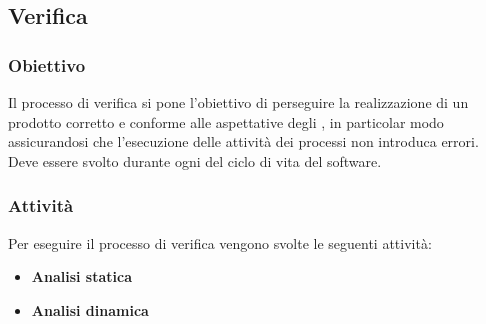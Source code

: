 \subsection{Verifica}
\subsubsection{Obiettivo}
Il processo di verifica si pone l’obiettivo di perseguire la realizzazione di un prodotto corretto e conforme alle aspettative degli , in particolar modo assicurandosi che l'esecuzione delle attività dei processi non introduca errori.
Deve essere svolto durante ogni  del ciclo di vita del software.

\subsubsection{Attività}
Per eseguire il processo di verifica vengono svolte le seguenti attività:
\begin{itemize} 
\item \textbf{Analisi statica}
\item \textbf{Analisi dinamica}
\end{itemize}

